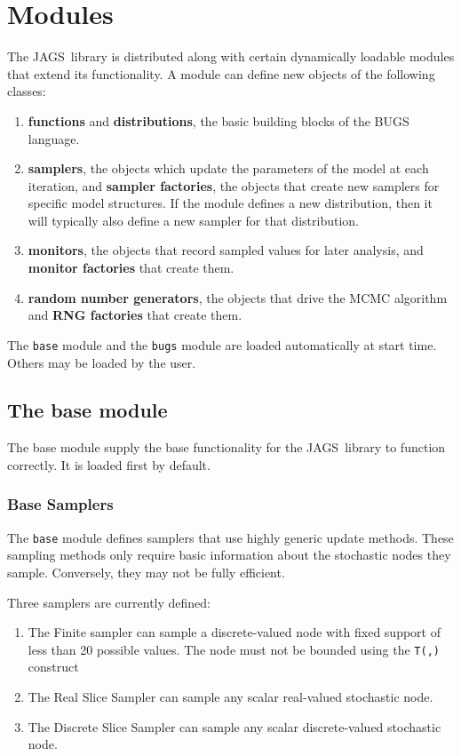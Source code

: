 \documentclass[11pt, a4paper, titlepage]{report}
\newcommand{\JAGS}{\textsf{JAGS}}
\begin{document}
\chapter{Modules}
\label{section:modules}

The \JAGS\  library is distributed along with certain dynamically
loadable modules that extend its functionality. A module can define
new objects of the following classes:
\begin{enumerate}
\item {\bf functions} and {\bf distributions}, the basic building
blocks of the BUGS language.
\item {\bf samplers}, the objects which update the parameters of the
model at each iteration, and {\bf sampler factories}, the objects that 
create new samplers for specific model structures.  If the module
defines a new distribution, then it will typically also define a new
sampler for that distribution.
\item {\bf monitors}, the objects that record sampled values for
later analysis, and {\bf monitor factories} that create them. 
\item {\bf random number generators}, the objects that drive the
MCMC algorithm and {\bf RNG factories} that create them.
\end{enumerate}

The \verb+base+ module and the \verb+bugs+ module are loaded automatically
at start time.  Others may be loaded by the user.

\section{The base module}

The base module supply the base functionality for the \JAGS\ library
to function correctly. It is loaded first by default.  

\subsection{Base Samplers}

The \verb+base+ module defines samplers that use highly generic update
methods.  These sampling methods only require basic information about
the stochastic nodes they sample.  Conversely, they may not be fully
efficient.

Three samplers are currently defined:
\begin{enumerate}
\item The Finite sampler can sample a discrete-valued node with
fixed support of less than 20 possible values. The node must not
be bounded using the \verb+T(,)+ construct
\item The Real Slice Sampler can sample any scalar real-valued 
stochastic node.
\item The Discrete Slice Sampler can sample any scalar
discrete-valued stochastic node.
\end{enumerate}
\end{document}
